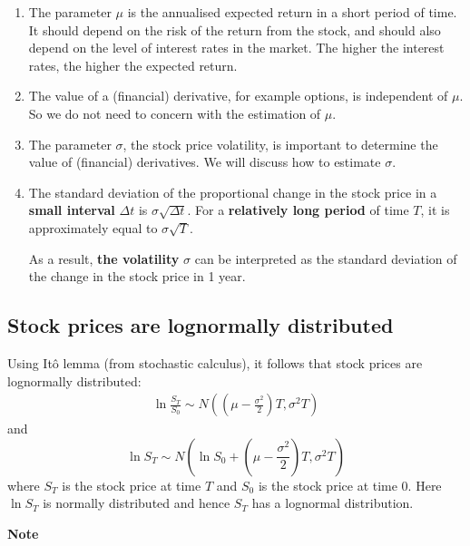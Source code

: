 \documentclass[
]{book}
\theoremstyle{definition}
\theoremstyle{definition}
\theoremstyle{definition}
\theoremstyle{definition}
\theoremstyle{remark}
\begin{document}
\begin{enumerate}
\def\labelenumi{\arabic{enumi}.}
\item
  The parameter \(\mu\) is the annualised expected return in a short
  period of time. It should depend on the risk of the return from the
  stock, and should also depend on the level of interest rates in the
  market. The higher the interest rates, the higher the expected
  return.
\item
  The value of a (financial) derivative, for example options, is
  independent of \(\mu\). So we do not need to concern with the
  estimation of \(\mu\).
\item
  The parameter \(\sigma\), the stock price volatility, is important to
  determine the value of (financial) derivatives. We will discuss how
  to estimate \(\sigma\).
\item
  The standard deviation of the proportional change in the stock price
  in a \textbf{small interval} \(\Delta t\) is \(\sigma \sqrt{\Delta t}\). For
  a \textbf{relatively long period} of time \(T\), it is approximately equal
  to \(\sigma \sqrt{T}\).

  As a result, \textbf{the volatility} \(\sigma\) can be interpreted as the
  standard deviation of the change in the stock price in 1 year.
\end{enumerate}

\hypertarget{stock-prices-are-lognormally-distributed}{%
\subsection*{Stock prices are lognormally distributed}\label{stock-prices-are-lognormally-distributed}}

Using Itô lemma (from stochastic calculus), it follows that stock prices
are lognormally distributed: \[\begin{aligned}
 \label{lognormal}
 \ln \frac{S_T}{S_0} \sim N\left((\mu - \frac{\sigma^2}{2})T,\sigma^2 T\right)
 \end{aligned}\] and
\[\ln S_T \sim N\left(\ln S_0 +  (\mu - \frac{\sigma^2}{2})T,\sigma^2 T\right)\]
where \(S_T\) is the stock price at time \(T\) and \(S_0\) is the stock price
at time 0. Here \(\ln S_T\) is normally distributed and hence \(S_T\) has a
lognormal distribution.

\textbf{Note}
\end{document}
